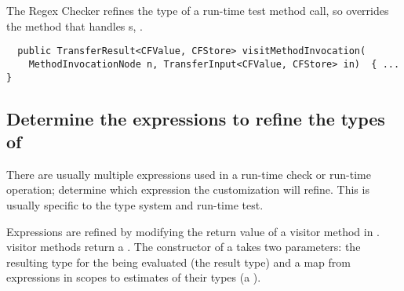 The Regex Checker refines the type of a run-time test method call, so
 overrides the method that handles
s,
.

\begin{smaller}
\begin{Verbatim}
  public TransferResult<CFValue, CFStore> visitMethodInvocation(
    MethodInvocationNode n, TransferInput<CFValue, CFStore> in)  { ... }
\end{Verbatim}
\end{smaller}

\subsection{Determine the expressions to refine the types of\label{dataflow-determine-expressions}}

There are usually multiple expressions used in a run-time check or run-time
operation; determine which expression the customization will refine.  This is
usually specific to the type system and run-time test.

\begin{sloppypar}
Expressions are refined by modifying the return value of a visitor method in
.
 visitor methods return a
.  The constructor of a
 takes two parameters: the resulting
type for the  being evaluated (the result
type) and a map from expressions in scopes to estimates of their types (a
).
\end{sloppypar}

